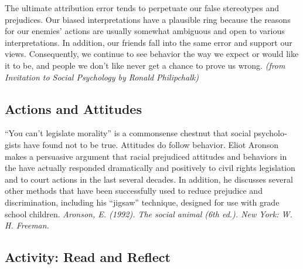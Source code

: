 \documentclass[
]{book}
\begin{document}
The ultimate attribution error tends to perpetuate our false stereotypes and prejudices. Our biased interpretations have a plausible ring because the reasons for our enemies' actions are usually somewhat ambiguous and open to various interpretations. In addition, our friends fall into the same error and support our views. Consequently, we continue to see behavior the way we expect or would like it to be, and people we don't like never get a chance to prove us wrong. \emph{(from Invitation to Social Psychology by Ronald Philipchalk)}

\hypertarget{actions-and-attitudes}{%
\subsection*{Actions and Attitudes}\label{actions-and-attitudes}}

``You can't legislate morality'' is a commonsense chestnut that social psycholo­gists have found not to be true. Attitudes do follow behavior. Eliot Aronson makes a persuasive argument that racial prejudiced attitudes and behaviors in the have actually responded dramatically and positively to civil rights legisla­tion and to court actions in the last several decades. In addition, he discusses sev­eral other methods that have been successfully used to reduce prejudice and discrimination, including his ``jigsaw'' technique, designed for use with grade school children. \emph{Aronson, E. (1992). The social animal (6th ed.). New York: W. H. Freeman.}

\hypertarget{activity-read-and-reflect-6}{%
\subsection*{Activity: Read and Reflect}\label{activity-read-and-reflect-6}}
\end{document}
